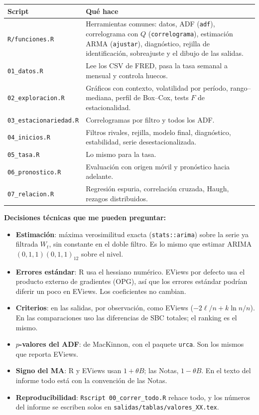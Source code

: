 \documentclass[11pt,a4paper]{article}
\begin{document}
\begin{center}\small
\begin{tabularx}{\linewidth}{lX}
\toprule
Script & Qu\'e hace \\
\midrule
\texttt{R/funciones.R} & Herramientas comunes: datos, ADF (\texttt{adf}), correlograma con $Q$ (\texttt{correlograma}), estimaci\'on ARMA (\texttt{ajustar}), diagn\'ostico, rejilla de identificaci\'on, sobreajuste y el dibujo de las salidas. \\
\texttt{01\_datos.R} & Lee los CSV de FRED, pasa la tasa semanal a mensual y controla huecos. \\
\texttt{02\_exploracion.R} & Gr\'aficos con contexto, volatilidad por per\'iodo, rango--mediana, perfil de Box--Cox, tests $F$ de estacionalidad. \\
\texttt{03\_estacionariedad.R} & Correlogramas por filtro y todos los ADF. \\
\texttt{04\_inicios.R} & Filtros rivales, rejilla, modelo final, diagn\'ostico, estabilidad, serie desestacionalizada. \\
\texttt{05\_tasa.R} & Lo mismo para la tasa. \\
\texttt{06\_pronostico.R} & Evaluaci\'on con origen m\'ovil y pron\'ostico hacia adelante. \\
\texttt{07\_relacion.R} & Regresi\'on espuria, correlaci\'on cruzada, Haugh, rezagos distribuidos. \\
\bottomrule
\end{tabularx}
\end{center}

\textbf{Decisiones t\'ecnicas que me pueden preguntar:}
\begin{itemize}
\item \textbf{Estimaci\'on}: m\'axima verosimilitud exacta (\texttt{stats::arima}) sobre la serie ya filtrada $W_t$, sin constante en el doble filtro. Es lo mismo que estimar ARIMA$(0,1,1)(0,1,1)_{12}$ sobre el nivel.
\item \textbf{Errores est\'andar}: R usa el hessiano num\'erico. EViews por defecto usa el producto externo de gradientes (OPG), as\'i que los errores est\'andar podr\'ian diferir un poco en EViews. Los coeficientes no cambian.
\item \textbf{Criterios}: en las salidas, por observaci\'on, como EViews ($-2\ell/n+k\ln n/n$). En las comparaciones uso las diferencias de SBC totales; el ranking es el mismo.
\item \textbf{$p$-valores del ADF}: de MacKinnon, con el paquete \texttt{urca}. Son los mismos que reporta EViews.
\item \textbf{Signo del MA}: R y EViews usan $1+\theta B$; las Notas, $1-\theta B$. En el texto del informe todo est\'a con la convenci\'on de las Notas.
\item \textbf{Reproducibilidad}: \texttt{Rscript 00\_correr\_todo.R} rehace todo, y los n\'umeros del informe se escriben solos en \texttt{salidas/tablas/valores\_XX.tex}.
\end{itemize}
\end{document}

